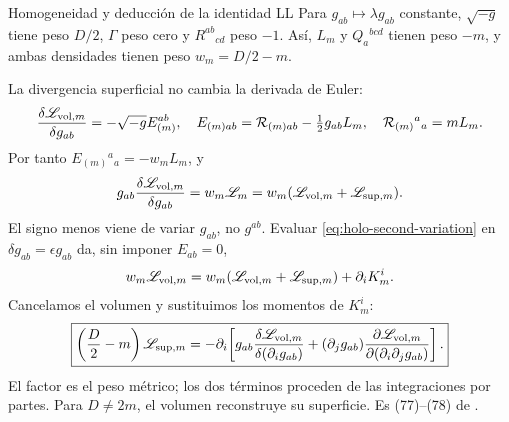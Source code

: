 \begin{frame}[label=holo-ll-08]{Homogeneidad y deducción de la identidad LL}
\hypertarget{holo-ll-09}{}
\footnotesize\CompactDisplaySpacing
Para $g_{ab}\mapsto\lambda g_{ab}$ constante, $\sqrt{-g}$ tiene peso $D/2$, $\Gamma$ peso cero y $R^{ab}{}_{cd}$ peso $-1$. Así, $L_m$ y $Q_a{}^{bcd}$ tienen peso $-m$, y ambas densidades tienen peso $w_m=D/2-m$.

La divergencia superficial no cambia la derivada de Euler:
\[
\frac{\delta\mathscr L_{{\rm vol},m}}{\delta g_{ab}}=-\sqrt{-g}E_{(m)}^{ab},\quad
E_{(m)ab}=\mathcal{R}_{(m)ab}-\tfrac12g_{ab}L_m,\quad
\mathcal{R}_{(m)}{}^a{}_a=mL_m.
\]
Por tanto $E_{(m)}{}^a{}_a=-w_mL_m$, y
\begin{equation}
g_{ab}\frac{\delta\mathscr L_{{\rm vol},m}}{\delta g_{ab}}
=w_m\mathscr L_m=w_m(\mathscr L_{{\rm vol},m}+\mathscr L_{{\rm sup},m}).
\label{eq:holo-trace}
\end{equation}
El signo menos viene de variar $g_{ab}$, no $g^{ab}$. Evaluar \eqref{eq:holo-second-variation} en $\delta g_{ab}=\epsilon g_{ab}$ da, sin imponer $E_{ab}=0$,
\[
w_m\mathscr L_{{\rm vol},m}=w_m(\mathscr L_{{\rm vol},m}+\mathscr L_{{\rm sup},m})+\partial_iK_m^i.
\]
Cancelamos el volumen y sustituimos los momentos de $K_m^i$:
\begin{equation}
\boxed{\left(\frac D2-m\right)\mathscr L_{{\rm sup},m}=-\partial_i\!\left[
g_{ab}\frac{\delta\mathscr L_{{\rm vol},m}}{\delta(\partial_i g_{ab})}
+(\partial_jg_{ab})\frac{\partial\mathscr L_{{\rm vol},m}}{\partial(\partial_i\partial_jg_{ab})}
\right].}
\label{eq:holo-LL-identity}
\end{equation}
El factor es el peso métrico; los dos términos proceden de las integraciones por partes. Para $D\ne2m$, el volumen reconstruye su superficie. Es (77)--(78) de \cite{PadmanabhanKothawala2013}.
\end{frame}

